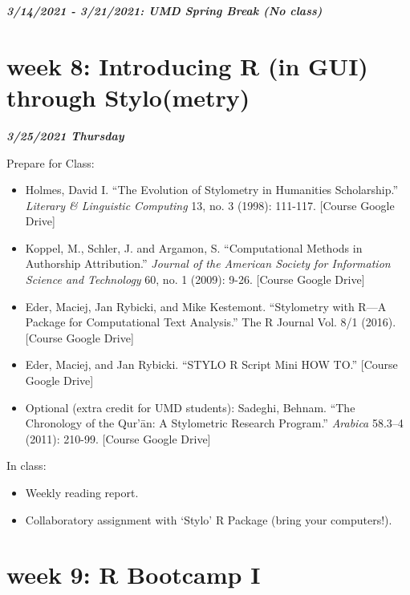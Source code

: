 \documentclass[
]{book}
\providecommand{\tightlist}{%
  \setlength{\itemsep}{0pt}\setlength{\parskip}{0pt}}
\begin{document}
\textbf{\emph{3/14/2021 - 3/21/2021: UMD Spring Break (No class)}}

\hypertarget{week-8-introducing-r-in-gui-through-stylometry-1}{%
\chapter{week 8: Introducing R (in GUI) through Stylo(metry)}\label{week-8-introducing-r-in-gui-through-stylometry-1}}

\textbf{\emph{3/25/2021 Thursday}}

Prepare for Class:

\begin{itemize}
\tightlist
\item
  Holmes, David I. ``The Evolution of Stylometry in Humanities Scholarship.'' \emph{Literary \& Linguistic Computing} 13, no. 3 (1998): 111-117. {[}Course Google Drive{]}
\item
  Koppel, M., Schler, J. and Argamon, S. ``Computational Methods in Authorship Attribution.'' \emph{Journal of the American Society for Information Science and Technology} 60, no. 1 (2009): 9-26. {[}Course Google Drive{]}\\
\item
  Eder, Maciej, Jan Rybicki, and Mike Kestemont. ``Stylometry with R---A Package for Computational Text Analysis.'' The R Journal Vol. 8/1 (2016). {[}Course Google Drive{]}\\
\item
  Eder, Maciej, and Jan Rybicki. ``STYLO R Script Mini HOW TO.'' {[}Course Google Drive{]}\\
\item
  Optional (extra credit for UMD students): Sadeghi, Behnam. ``The Chronology of the Qur'ān: A Stylometric Research Program.'' \emph{Arabica} 58.3--4 (2011): 210-99. {[}Course Google Drive{]}
\end{itemize}

In class:

\begin{itemize}
\tightlist
\item
  Weekly reading report.
\item
  Collaboratory assignment with `Stylo' R Package (bring your computers!).
\end{itemize}

\hypertarget{week-9-r-bootcamp-i-1}{%
\chapter{week 9: R Bootcamp I}\label{week-9-r-bootcamp-i-1}}
\end{document}
